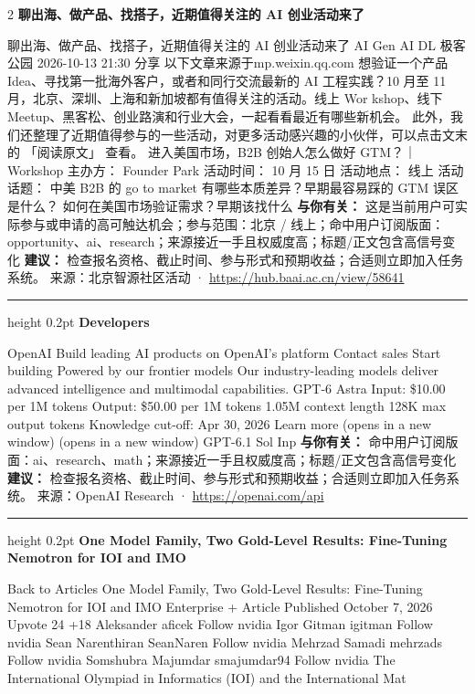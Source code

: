 \documentclass[10.5pt]{ctexart}
\begin{document}
\begin{multicols}{2}
{\large\bfseries 聊出海、做产品、找搭子，近期值得关注的 AI 创业活动来了}\par
聊出海、做产品、找搭子，近期值得关注的 AI 创业活动来了 AI Gen AI DL 极客公园 2026-10-13 21:30 分享 以下文章来源于mp.weixin.qq.com 想验证一个产品 Idea、寻找第一批海外客户，或者和同行交流最新的 AI 工程实践？10 月至 11 月，北京、深圳、上海和新加坡都有值得关注的活动。线上 Wor kshop、线下 Meetup、黑客松、创业路演和行业大会，一起看看最近有哪些新机会。 此外，我们还整理了近期值得参与的一些活动，对更多活动感兴趣的小伙伴，可以点击文末的 「阅读原文」 查看。 进入美国市场，B2B 创始人怎么做好 GTM？｜Workshop 主办方： Founder Park 活动时间： 10 月 15 日 活动地点： 线上 活动话题： 中美 B2B 的 go to market 有哪些本质差异？早期最容易踩的 GTM 误区是什么？ 如何在美国市场验证需求？早期该找什么
\textbf{与你有关：} 这是当前用户可实际参与或申请的高可触达机会；参与范围：北京 / 线上；命中用户订阅版面：opportunity、ai、research；来源接近一手且权威度高；标题/正文包含高信号变化
\textbf{建议：} 检查报名资格、截止时间、参与形式和预期收益；合适则立即加入任务系统。
{\footnotesize\color{ormuted} 来源：北京智源社区活动 · \url{https://hub.baai.ac.cn/view/58641}}
\vspace{2mm}
\hrule height 0.2pt
\vspace{2mm}
{\large\bfseries Developers}\par
OpenAI Build leading AI products on OpenAI’s platform Contact sales Start building Powered by our frontier models Our industry-leading models deliver advanced intelligence and multimodal capabilities. GPT-6 Astra Input: \$10.00 per 1M tokens Output: \$50.00 per 1M tokens 1.05M context length 128K max output tokens Knowledge cut-off: Apr 30, 2026 Learn more (opens in a new window) (opens in a new window) GPT-6.1 Sol Inp
\textbf{与你有关：} 命中用户订阅版面：ai、research、math；来源接近一手且权威度高；标题/正文包含高信号变化
\textbf{建议：} 检查报名资格、截止时间、参与形式和预期收益；合适则立即加入任务系统。
{\footnotesize\color{ormuted} 来源：OpenAI Research · \url{https://openai.com/api}}
\vspace{2mm}
\hrule height 0.2pt
\vspace{2mm}
{\large\bfseries One Model Family, Two Gold-Level Results: Fine-Tuning Nemotron for IOI and IMO}\par
Back to Articles One Model Family, Two Gold-Level Results: Fine-Tuning Nemotron for IOI and IMO Enterprise + Article Published October 7, 2026 Upvote 24 +18 Aleksander aficek Follow nvidia Igor Gitman igitman Follow nvidia Sean Narenthiran SeanNaren Follow nvidia Mehrzad Samadi mehrzads Follow nvidia Somshubra Majumdar smajumdar94 Follow nvidia The International Olympiad in Informatics (IOI) and the International Mat

\end{multicols}
\end{document}
